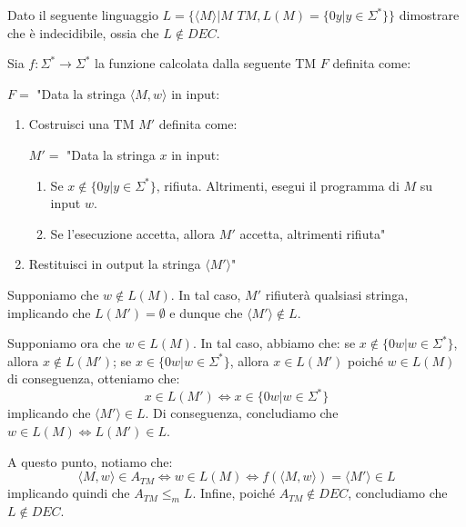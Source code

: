 \begin{Exercise}{}{}
Dato il seguente linguaggio $L = \{\langle M\rangle | M\textit{ TM}, L(M) = \{0y | y \in \Sigma^*\}\}$ dimostrare che è indecidibile, ossia che $L \notin DEC$.

\begin{demonstration}
Sia $f : \Sigma^* \rightarrow \Sigma^*$ la funzione calcolata dalla seguente TM $F$ definita come:

$F =$ "Data la stringa $\langle M, w\rangle$ in input:
\begin{enumerate}
    \item Costruisci una TM $M'$ definita come:
    
    $M' =$ "Data la stringa $x$ in input:
    \begin{enumerate}
        \item Se $x \notin \{0y | y \in \Sigma^*\}$, rifiuta. Altrimenti, esegui il programma di $M$ su input $w$.
        \item Se l’esecuzione accetta, allora $M'$ accetta, altrimenti rifiuta"
    \end{enumerate}
    \item Restituisci in output la stringa $\langle M'\rangle$"
\end{enumerate}
Supponiamo che $w \notin L(M)$. In tal caso, $M'$ rifiuterà qualsiasi stringa, implicando che $L(M'
) = \emptyset$ e dunque che $\langle M'\rangle \notin L$. 

Supponiamo ora che $w \in L(M)$. In tal caso, abbiamo che: se $x \notin \{0w | w \in \Sigma^*\}$, allora $x \notin L(M')$; se $x \in \{0w | w \in \Sigma^*\}$, allora $x \in L(M')$ poiché $w \in L(M)$
di conseguenza, otteniamo che:
\begin{equation*}
x \in L(M') \iff x \in \{0w | w \in \Sigma^*\}
\end{equation*}
implicando che $\langle M'\rangle \in L$. Di conseguenza, concludiamo che $w \in L(M) \iff L(M') \in L$.

A questo punto, notiamo che:
\begin{equation*}
\langle M, w\rangle \in A_{TM}\iff w \in L(M) \iff f(\langle M, w\rangle) = \langle M'\rangle \in L    
\end{equation*}
implicando quindi che $A_{TM} \leq_m L$. Infine, poiché $A_{TM} \notin DEC$, concludiamo che $L \notin DEC$.
\end{demonstration}
\end{Exercise}

